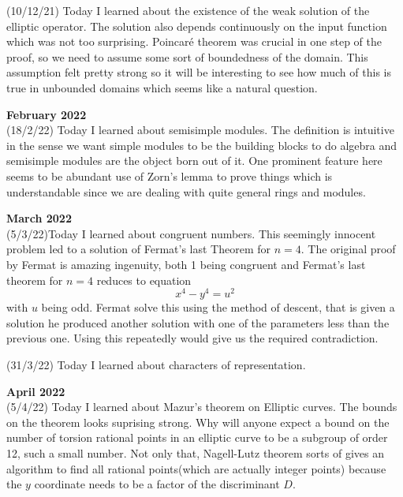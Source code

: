 \documentclass[12pt,a4paper]{article}
\begin{document}
   (10/12/21) Today I learned about the existence of the weak solution of the elliptic operator. The solution also depends continuously on the input function which was not too surprising. Poincar\'{e} theorem was crucial in one step of the proof, so we need to assume some sort of boundedness of the domain. This assumption felt pretty strong so it will be interesting to see how much of this is true in unbounded domains which seems like a natural question.\\
   
   \maketitle\textbf{February 2022}
   \\
   
   	(18/2/22) Today I learned about semisimple modules. The definition is intuitive in the sense we want simple modules to be the building blocks to do algebra and semisimple modules are the object born out of it. One prominent feature here seems to be abundant use of Zorn's lemma to prove things which is understandable since we are dealing with quite general rings and modules.
   	\\
   	
   	\maketitle\textbf{March 2022}
   	\\
   (5/3/22)Today I learned about congruent numbers. This seemingly innocent problem led to a solution of Fermat's last Theorem for $n=4$. The original proof by Fermat is amazing ingenuity, both 1 being congruent and Fermat's last theorem for $n=4$ reduces to equation
   \[ x^4-y^4 = u^2 \]
   with $u$  being odd. Fermat solve this using the method of descent, that is given a solution he produced another solution with one of the parameters less than the previous one. Using this repeatedly would give us the required contradiction.
   
   (31/3/22) Today I learned about characters of representation. 
   	\\
   
   \maketitle\textbf{April 2022}
   \\
   (5/4/22) Today I learned about Mazur's theorem on Elliptic curves. The bounds on the theorem looks suprising strong. Why will anyone expect a bound on the number of torsion rational points in an elliptic curve to be a subgroup of order 12, such a small number. Not only that, Nagell-Lutz theorem sorts of gives an algorithm to find all rational points(which are actually integer points) because the $y$ coordinate needs to be a factor of the discriminant $D$.
   
\end{document}
